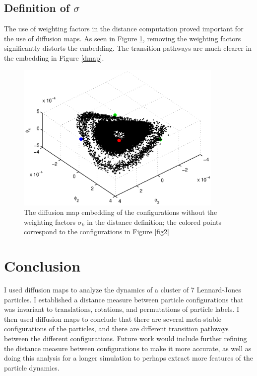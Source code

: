 \subsection{Definition of $\sigma$}
The use of weighting factors in the distance computation proved important for the use of diffusion maps. As seen in Figure \ref{dmap_nosigma}, removing the weighting factors significantly distorts the embedding. The transition pathways are much clearer in the embedding in Figure \ref{dmap}.

\begin{figure}[t]
\includegraphics[width=10cm]{dmap_nosigma.eps}
\caption[Diffusion maps embedding of Lennard-Jones cluster without weight factors]{The diffusion map embedding of the configurations without the weighting factors $\sigma_k$ in the distance definition; the colored points correspond to the configurations in Figure \ref{fig2}}
\label{dmap_nosigma}
\end{figure}

\section{Conclusion}
I used diffusion maps to analyze the dynamics of a cluster of 7 Lennard-Jones particles. I established a distance measure between particle configurations that was invariant to translations, rotations, and permutations of particle labels. I then used diffusion maps to conclude that there are several meta-stable configurations of the particles, and there are different transition pathways between the different configurations. Future work would include further refining the distance measure between configurations to make it more accurate, as well as doing this analysis for a longer simulation to perhaps extract more features of the particle dynamics.